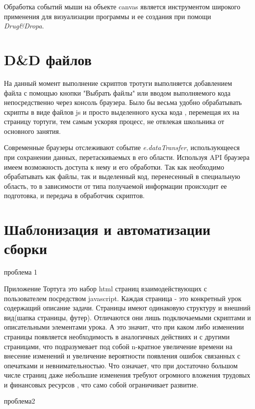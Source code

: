 Обработка событий мыши на объекте canvas является инструментом  широкого применения для визуализации программы и ее создания при помощи \textit{Drug\&Dropa}.



\chapter{D\&D файлов} \label{chapt1}
На данный момент выполнение скриптов тротуги выполняется добавлением файла с помощью кнопки "Выбрать файлы" или вводом выполняемого кода непосредственно через консоль браузера.  Было бы весьма удобно обрабатывать скрипты в виде файлов js и просто выделенного куска кода , перемещая их  на страницу тортуги, тем самым ускоряя процесс, не отвлекая школьника от основного занятия.

Современные браузеры отслеживают событие \textit{e.dataTransfer}, использующееся при сохранении данных, перетаскиваемых в его области. Используя API браузера имеем возможность доступа к нему и его обработки. Так как необходимо обрабатывать как файлы, так и выделенный код, перенесенный в специальную область, то в зависимости от типа получаемой информации  происходит ее подготовка, и передача в обработчик скриптов.

\chapter{Шаблонизация и автоматизации сборки} \label{chapt1}

проблема 1

Приложение Тортуга это набор html страниц взаимодействующих с пользователем посредством javascript. Каждая страница - это конкретный урок содержащий  описание задачи. Страницы имеют одинаковую структуру и внешний вид(шапка страницы, футер). Отличаются они лишь подключаемыми скриптами и описательными элементами урока. А это значит, что при каком либо изменении страницы появляется необходимость в аналогичных действиях и с другими страницами, что подразумевает под собой n-кратное увеличение времени на внесение изменений и увеличение вероятности появления ошибок связанных с опечатками и невнимательностью. Что означает, что  при достаточно большом числе страниц  даже небольшие изменения требуют огромного вложения трудовых и финансовых ресурсов , что само собой ограничивает развитие.


проблема2

